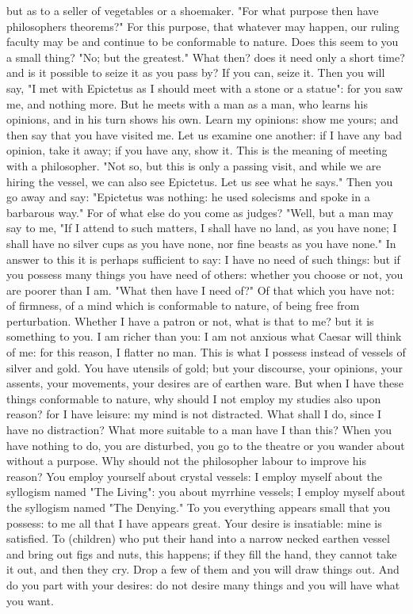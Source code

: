 \documentclass[a4paper]{article}
\begin{document}
but as to a seller of vegetables or a shoemaker. "For what purpose then have
philosophers theorems?" For this purpose, that whatever may happen, our ruling
faculty may be and continue to be conformable to nature. Does this seem to you
a small thing? "No; but the greatest." What then? does it need only a short
time? and is it possible to seize it as you pass by? If you can, seize it.
    Then you will say, "I met with Epictetus as I should meet with a stone or a
statue": for you saw me, and nothing more. But he meets with a man as a man,
who learns his opinions, and in his turn shows his own. Learn my opinions: show
me yours; and then say that you have visited me. Let us examine one another: if
I have any bad opinion, take it away; if you have any, show it. This is the
meaning of meeting with a philosopher. "Not so, but this is only a passing
visit, and while we are hiring the vessel, we can also see Epictetus. Let us
see what he says." Then you go away and say: "Epictetus was nothing: he used
solecisms and spoke in a barbarous way." For of what else do you come as
judges? "Well, but a man may say to me, "If I attend to such matters, I shall
have no land, as you have none; I shall have no silver cups as you have none,
nor fine beasts as you have none." In answer to this it is perhaps sufficient
to say: I have no need of such things: but if you possess many things you have
need of others: whether you choose or not, you are poorer than I am. "What then
have I need of?" Of that which you have not: of firmness, of a mind which is
conformable to nature, of being free from perturbation. Whether I have a patron
or not, what is that to me? but it is something to you. I am richer than you: I
am not anxious what Caesar will think of me: for this reason, I flatter no man.
This is what I possess instead of vessels of silver and gold. You have utensils
of gold; but your discourse, your opinions, your assents, your movements, your
desires are of earthen ware. But when I have these things conformable to
nature, why should I not employ my studies also upon reason? for I have
leisure: my mind is not distracted. What shall I do, since I have no
distraction? What more suitable to a man have I than this? When you have
nothing to do, you are disturbed, you go to the theatre or you wander about
without a purpose. Why should not the philosopher labour to improve his reason?
You employ yourself about crystal vessels: I employ myself about the syllogism
named "The Living": you about myrrhine vessels; I employ myself about the
syllogism named "The Denying." To you everything appears small that you
possess: to me all that I have appears great. Your desire is insatiable: mine
is satisfied. To (children) who put their hand into a narrow necked earthen
vessel and bring out figs and nuts, this happens; if they fill the hand, they
cannot take it out, and then they cry. Drop a few of them and you will draw
things out. And do you part with your desires: do not desire many things and
you will have what you want.
\end{document}
